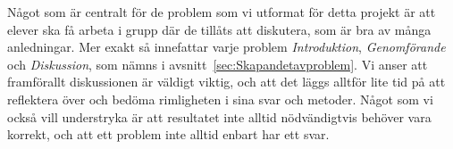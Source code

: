 
\textcolor{Mahogany}{
    Något som är centralt för de problem som vi utformat för detta projekt är att elever ska få arbeta i grupp där de tillåts att diskutera, som är bra av många anledningar. Mer exakt så innefattar varje problem \textsl{Introduktion}, \textsl{Genomförande} och \textsl{Diskussion}, som nämns i avsnitt~\ref{sec:Skapandetavproblem}. Vi anser att framförallt diskussionen är väldigt viktig, och att det läggs alltför lite tid på att reflektera över och bedöma rimligheten i sina svar och metoder. Något som vi också vill understryka är att resultatet inte alltid nödvändigtvis behöver vara korrekt, och att ett problem inte alltid enbart har ett svar.
}
